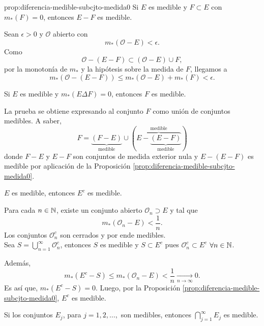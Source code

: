 \begin{proposicion}{prop:diferencia-medible-subcjto-medida0}
Si $E$ es medible y $F\subset E$ con $m_{*}(F)=0$, entonces
$E-F$ es medible.
\end{proposicion}

\begin{demo}{}
Sean $\epsilon>0$ y $\mathcal{O}$ abierto con 
\[
m_{*}(\mathcal{O}-E)<\epsilon.
\]
Como
\[
\mathcal{O}-(E-F)\subset (\mathcal{O}-E)\cup F, 
\]
por la monoton\'ia de $m_{*}$ y la hip\'otesis sobre la medida de $F$, llegamos a 
\[
m_{*}\left(\mathcal{O}-(E-F)\right)\leq m_{*}(\mathcal{O}-E)+m_{*}(F)<\epsilon.
\]
\end{demo}

\begin{corolario}{}
Si $E$ es medible  y $m_{*}(E \Delta F)=0$, entonces $F$ es medible.
\end{corolario}

\begin{demo}{}
La prueba se obtiene expresando al conjunto $F$ como uni\'on de conjuntos medibles. A saber, 
\[
F=\underbrace{(F-E)}_{\mbox{medible}} \cup 
\left( 
\overbrace{E-\underbrace{(E-F)}_{\mbox{medible}}}^{\mbox{medible}}\right)
\]
donde $F-E$ y $E-F$ son conjuntos de medida exterior nula y 
$E-(E-F)$  es medible por aplicaci\'on de la Proposici\'on \ref{prop:diferencia-medible-subcjto-medida0}.
\end{demo}


\begin{proposicion}{}
$E$ es medible, entonces $E^c$ es medible.
\end{proposicion}

\begin{demo}{}
Para cada $n \in \mathbb{N}$, existe un conjunto abierto $\mathcal{O}_n \supset E$ y tal que 
\[
m_{*}(\mathcal{O}_n-E)<\frac{1}{n}.
\]
Los conjuntos $\mathcal{O}_n^c$ son cerrados y por ende medibles. \\
Sea $S=\bigcup\limits_{n=1}^{\infty} \mathcal{O}_n^c$, entonces $S$ es medible y $S\subset E^c$ pues $\mathcal{O}_n^c \subset E^c$ $\forall n\in \mathbb{N}$.

Adem\'as, 
\[
m_{*}(E^c-S)\leq m_{*}(\mathcal{O}_n-E)<\frac{1}{n} \xrightarrow[ n \to \infty]{} 0.
\]
Es as\'i que,   $m_{*}(E^c-S)=0$. Luego,  por la Proposici\'on \ref{prop:diferencia-medible-subcjto-medida0}, $E^c$ es medible.
\end{demo}

\begin{proposicion}{}
Si los conjuntos $E_j$, para $j=1,2,\ldots,$ son medibles, entonces
$\bigcap\limits_{j=1}^{\infty}E_j$ es medible.
\end{proposicion}


